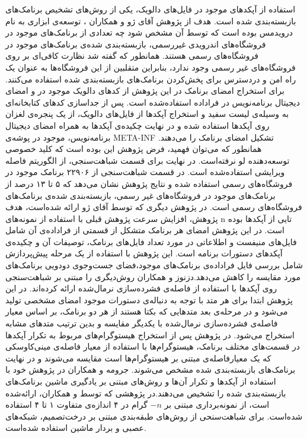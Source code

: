 استفاده از آپکد‌های موجود در فایل‌های دالویک، یکی از روش‌های تشخیص برنامک‌های بازبسته‌بندی شده است. هدف از پژوهش آقای ژو و همکاران ، توسعه‌ی ابزاری به نام درویدمس بوده است که توسط آن مشخص شود چه تعدادی از برنامک‌های موجود در فروشگاه‌های اندرویدی غیررسمی، بازبسته‌بندی شده‌ی برنامک‌های موجود در فروشگاه‌های رسمی هستند. همانطور که گفته شد نظارت کافی‌ای بر روی فروشگاه‌های غیر رسمی وجود ندارد، بنابراین متقلبین از این فروشگاه‌ها به عنوان یک راه امن و دردسترس برای پخش‌کردن برنامک‌های بازبسته‌بندی شده استفاده می‌کنند. برای استخراج امضا‌ی برنامک در این پژوهش از کد‌های دالویک موجود در  و امضای دیجیتال برنامه‌نویس در فراداده‌ استفاده‌شده است. پس از جداسازی کد‌های کتابخانه‌ای به وسیله‌ی لیست سفید و استخراج آپکد‌ها از فایل‌های دالویک، از یک پنجره‌ی لغزان روی آپکد‌ها استفاده شده و در نهایت چکیده‌ی آپکد‌ها به همراه امضای دیجیتال برنامه‌نویس، موجود در پوشه‌ی META-INF تشکیل امضا‌ی برنامک را می‌دهند. همانطور که می‌توان فهمید، فرض پژوهش این بوده است که کلید خصوصی توسعه‌دهنده لو نرفته‌است. در نهایت برای قسمت‌ شباهت‌سنجی، از الگوریتم فاصله ویرایشی استفاده‌شده است. در قسمت شباهت‌سنجی از ۲۲۹۰۶ برنامک موجود در فروشگاه‌های رسمی استفاده شده‌ و نتایج پژوهش نشان می‌دهد که ۵ تا ۱۳ درصد از برنامک‌های موجود در فروشگاه‌های غیر رسمی، بازبسته‌بندی شده‌ی برنامک‌های فروشگاه‌های رسمی است. در پژوهش دیگری که توسط آقای ژو ارائه شده‌است، هدف پژوهش، افزایش سرعت پژوهش‌ قبلی با استفاده از نمونه‌های n تایی از آپکد‌ها بوده است. در این پژوهش امضای هر برنامک متشکل از قسمتی از فراداده‌ی آن شامل فایل‌های منیفست و اطلاعاتی در مورد تعداد فایل‌های برنامک، توصیفات آن و چکیده‌ی آپکد‌های دستورات برنامه‌ است. این پژوهش با استفاده از یک مرحله پیش‌پردازش شامل بررسی فایل فراداده‌ی برنامک‌های موجود،‌فضای جست‌و‌جوی دودویی برنامک‌های مورد مقایسه را کاهش می‌دهد.دزنوز و همکاران روش‌دیگری را مبتنی بر شباهت‌سنجی روی آپکد‌ها با استفاده از فاصله‌ی فشرده‌سازی نرما‌ل‌شده ارائه کرده‌اند. در این پژوهش ابتدا برای هر متد با توجه به دنباله‌ی دستورات موجود امضای مشخصی تولید می‌شود و در مرحله‌ی بعد متد‌هایی که بکتا هستند از هر دو برنامک، بر اساس معیار فاصله‌ی فشرده‌سازی نرمال‌شده با یکدیگر مقایسه و بدین ترتیب متد‌های مشابه‌ استخراج می‌شود. در پژوهش  پس از استخراج هیستوگرام‌های مربوط به تکرار آپکد‌ها در قسمت‌های مختلف برنامک، هیستوگرام‌ها با استفاده از معیار فاصله‌ی  مینی‌کاوسکی که یک معیارفاصله‌ی مبتنی بر هیستوگرام‌ها است مقایسه‌ می‌شوند و در نهایت برنامک‌های بازبسته‌بندی شده مشخص می‌شوند. جرومه و همکاران در پژوهش خود با استفاده از آپکد‌ها و تکرار آن‌ها و روش‌های مبتنی بر یادگیری ماشین برنامک‌های بازبسته‌بندی شده را تشخیص می‌دهند.در پژوهشی که توسط  و همکاران، ارائه‌شده است، از نمونه‌برداری مبتنی بر $-n$ گرام در ۴ اندازه‌ی متفاوت ۱ تا ۴ استفاده شده‌است. برای شباهت‌سنحی از روش‌های طبقه‌بندی مبتنی بر درخت‌تصمیم، شبکه‌های عصبی و بردار ماشین استفاده شده‌است.

